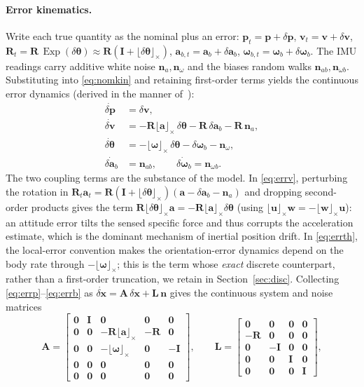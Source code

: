\documentclass[11pt]{article}
\newcommand{\R}{\mathbf{R}}
\newcommand{\I}{\mathbf{I}}
\newcommand{\bp}{\mathbf{p}}
\newcommand{\bv}{\mathbf{v}}
\newcommand{\ba}{\mathbf{a}}
\newcommand{\bn}{\mathbf{n}}
\newcommand{\bomega}{\bm{\omega}}
\newcommand{\bx}{\mathbf{x}}
\newcommand{\bA}{\mathbf{A}}
\newcommand{\bL}{\mathbf{L}}
\newcommand{\skewm}[1]{\lfloor #1 \rfloor_\times}
\newcommand{\dtheta}{\delta\bm{\theta}}
\newcommand{\dx}{\delta\bx}
\DeclareMathOperator{\Exp}{Exp}
\begin{document}
\paragraph{Error kinematics.}
Write each true quantity as the nominal plus an error: $\bp_t=\bp+\delta\bp$, $\bv_t=\bv+\delta\bv$,
$\R_t=\R\,\Exp(\dtheta)\approx\R(\I+\skewm{\dtheta})$, $\ba_{b,t}=\ba_b+\delta\ba_b$,
$\bomega_{b,t}=\bomega_b+\delta\bomega_b$. The IMU readings carry additive white noise
$\bn_a,\bn_\omega$ and the biases random walks $\bn_{ab},\bn_{\omega b}$. Substituting into
\eqref{eq:nomkin} and retaining first-order terms yields the continuous error dynamics (derived in the
manner of~\cite{sola2017,trawny2005}):
\begin{align}
  \dot{\delta\bp} &= \delta\bv, \label{eq:errp}\\
  \dot{\delta\bv} &= -\R\skewm{\ba}\,\dtheta - \R\,\delta\ba_b - \R\,\bn_a, \label{eq:errv}\\
  \dot{\dtheta}   &= -\skewm{\bomega}\,\dtheta - \delta\bomega_b - \bn_\omega, \label{eq:errth}\\
  \dot{\delta\ba_b} &= \bn_{ab}, \qquad
  \dot{\delta\bomega_b} = \bn_{\omega b}. \label{eq:errb}
\end{align}
The two coupling terms are the substance of the model. In \eqref{eq:errv}, perturbing the rotation in
$\R_t\ba_t = \R(\I+\skewm{\dtheta})(\ba-\delta\ba_b-\bn_a)$ and dropping second-order products gives the
term $\R\skewm{\dtheta}\ba = -\R\skewm{\ba}\dtheta$ (using $\skewm{\bm u}\bm w = -\skewm{\bm w}\bm u$):
an attitude error tilts the sensed specific force and thus corrupts the acceleration estimate, which is
the dominant mechanism of inertial position drift. In \eqref{eq:errth}, the local-error convention
makes the orientation-error dynamics depend on the body rate through $-\skewm{\bomega}$; this is the
term whose \emph{exact} discrete counterpart, rather than a first-order truncation, we retain in
Section~\ref{sec:disc}. Collecting \eqref{eq:errp}--\eqref{eq:errb} as
$\dot{\dx} = \bA\,\dx + \bL\,\bn$ gives the continuous system and noise matrices
\begin{equation}
  \bA =
  \begin{bmatrix}
    \mathbf 0 & \I & \mathbf 0 & \mathbf 0 & \mathbf 0\\
    \mathbf 0 & \mathbf 0 & -\R\skewm{\ba} & -\R & \mathbf 0\\
    \mathbf 0 & \mathbf 0 & -\skewm{\bomega} & \mathbf 0 & -\I\\
    \mathbf 0 & \mathbf 0 & \mathbf 0 & \mathbf 0 & \mathbf 0\\
    \mathbf 0 & \mathbf 0 & \mathbf 0 & \mathbf 0 & \mathbf 0
  \end{bmatrix},
  \qquad
  \bL =
  \begin{bmatrix}
    \mathbf 0 & \mathbf 0 & \mathbf 0 & \mathbf 0\\
    -\R & \mathbf 0 & \mathbf 0 & \mathbf 0\\
    \mathbf 0 & -\I & \mathbf 0 & \mathbf 0\\
    \mathbf 0 & \mathbf 0 & \I & \mathbf 0\\
    \mathbf 0 & \mathbf 0 & \mathbf 0 & \I
  \end{bmatrix},
  \label{eq:Acont}
\end{equation}
\end{document}

